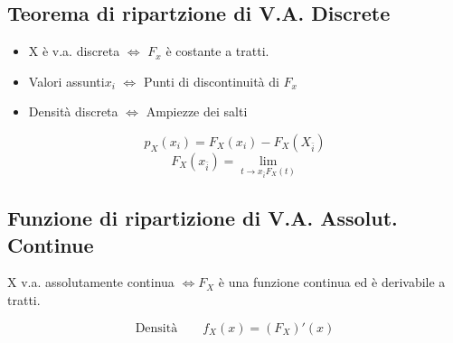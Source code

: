 \documentclass[12pt, a4paper, openany]{book}
\begin{document}
\subsection*{Teorema di ripartzione di V.A. Discrete}
\begin{itemize}
    \item X è v.a. discreta $\Leftrightarrow$ $F_x$ è costante a tratti.
    \item Valori assunti{$x_i$} $\Leftrightarrow$ Punti di discontinuità  di $F_x$
    \item Densità discreta $\Leftrightarrow$ Ampiezze dei salti
\end{itemize}
\begin{equation*}
    p_X (x_i) = F_X(x_i) - F_X(X_{\bar{i}})
\end{equation*}
\begin{equation*}
    F_X(x_{\bar{i}}) = \lim_{t \to x_{\bar{i}} F_X(t)}  
\end{equation*}
\subsection*{Funzione di ripartizione di V.A. Assolut. Continue}
X v.a. assolutamente continua $\Leftrightarrow F_X$ è una funzione continua ed
è derivabile a tratti.

\begin{equation}
    \text{Densità} \qquad f_X(x) = (F_X)'(x)
\end{equation}
\end{document}
